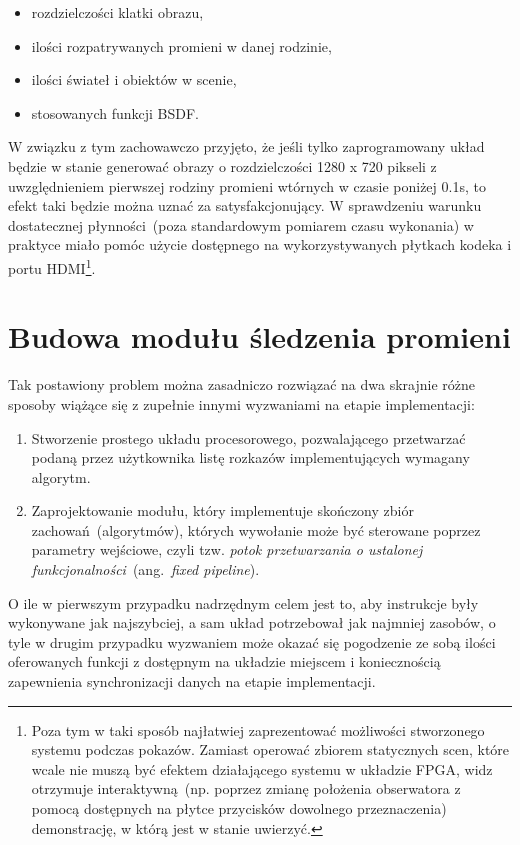 \begin{enumerate}
\begin{itemize}
\item rozdzielczości klatki obrazu,
\item ilości rozpatrywanych promieni w danej rodzinie,
\item ilości świateł i obiektów w scenie,
\item stosowanych funkcji BSDF.
\end{itemize} 
W związku z tym zachowawczo przyjęto, że jeśli tylko zaprogramowany układ będzie w stanie generować obrazy o rozdzielczości 1280 x 720 pikseli z uwzględnieniem pierwszej rodziny promieni wtórnych w czasie poniżej 0.1s, to efekt taki będzie można uznać za satysfakcjonujący. W sprawdzeniu warunku dostatecznej płynności~(poza standardowym pomiarem czasu wykonania) w praktyce miało pomóc użycie dostępnego na wykorzystywanych płytkach kodeka i portu HDMI\footnote{Poza tym w taki sposób najłatwiej zaprezentować możliwości stworzonego systemu podczas pokazów. Zamiast operować zbiorem statycznych scen, które wcale nie muszą być efektem działającego systemu w układzie FPGA, widz otrzymuje interaktywną~(np. poprzez zmianę położenia obserwatora z pomocą dostępnych na płytce przycisków dowolnego przeznaczenia) demonstrację, w którą jest w stanie uwierzyć.}.
\end{enumerate}

\section{Budowa modułu śledzenia promieni}
Tak postawiony problem można zasadniczo rozwiązać na dwa skrajnie różne sposoby wiążące się z zupełnie innymi wyzwaniami na etapie implementacji:
\begin{enumerate}
\item Stworzenie prostego układu procesorowego, pozwalającego przetwarzać podaną przez użytkownika listę rozkazów implementujących wymagany algorytm.
\item Zaprojektowanie modułu, który implementuje skończony zbiór zachowań~(algorytmów), których wywołanie może być sterowane poprzez parametry wejściowe, czyli tzw. \textit{potok przetwarzania o ustalonej funkcjonalności}~(ang.~\textit{fixed pipeline}).
\end{enumerate}
O ile w pierwszym przypadku nadrzędnym celem jest to, aby instrukcje były wykonywane jak najszybciej, a sam układ potrzebował jak najmniej zasobów, o tyle w drugim przypadku wyzwaniem może okazać się pogodzenie ze sobą ilości oferowanych funkcji z dostępnym na układzie miejscem i koniecznością zapewnienia synchronizacji danych na etapie implementacji.

